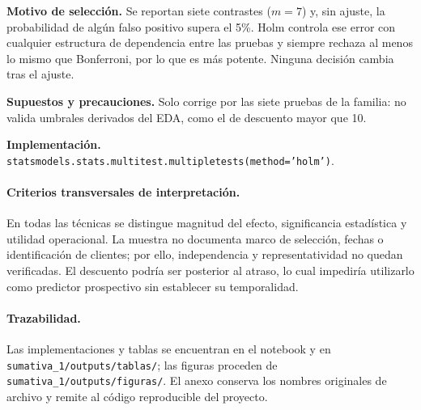 \documentclass[10pt,a4paper]{article}
\begin{document}
\textbf{Motivo de selección.} Se reportan siete contrastes ($m=7$) y, sin ajuste, la probabilidad de algún falso positivo supera el 5\%. Holm controla ese error con cualquier estructura de dependencia entre las pruebas y siempre rechaza al menos lo mismo que Bonferroni, por lo que es más potente. Ninguna decisión cambia tras el ajuste.

\textbf{Supuestos y precauciones.} Solo corrige por las siete pruebas de la familia: no valida umbrales derivados del EDA, como el de descuento mayor que 10.

\textbf{Implementación.} \texttt{statsmodels.stats.multitest.multipletests(method='holm')}.


\paragraph{Criterios transversales de interpretación.}
En todas las técnicas se distingue magnitud del efecto, significancia estadística y utilidad operacional. La muestra no documenta marco de selección, fechas o identificación de clientes; por ello, independencia y representatividad no quedan verificadas. El descuento podría ser posterior al atraso, lo cual impediría utilizarlo como predictor prospectivo sin establecer su temporalidad.

\paragraph{Trazabilidad.}
Las implementaciones y tablas se encuentran en el notebook y en \texttt{sumativa\_1/outputs/tablas/}; las figuras proceden de \texttt{sumativa\_1/outputs/figuras/}. El anexo conserva los nombres originales de archivo y remite al código reproducible del proyecto.
\end{document}
